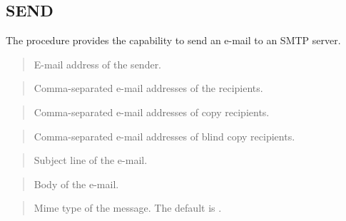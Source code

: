 \documentclass[letterpaper,10pt,english,openany,oneside]{sphinxmanual}
\begin{document}
\newpage


\subsection{SEND}
\label{\detokenize{utl_mail:send}}
The  procedure provides the capability to send an e-mail to an SMTP
server.



\begin{quote}

E-mail address of the sender.
\end{quote}

\begin{quote}

Comma-separated e-mail addresses of the recipients.
\end{quote}

\begin{quote}

Comma-separated e-mail addresses of copy recipients.
\end{quote}

\begin{quote}

Comma-separated e-mail addresses of blind copy recipients.
\end{quote}

\begin{quote}

Subject line of the e-mail.
\end{quote}

\begin{quote}

Body of the e-mail.
\end{quote}

\begin{quote}

Mime type of the message. The default is .
\end{quote}
\end{document}
